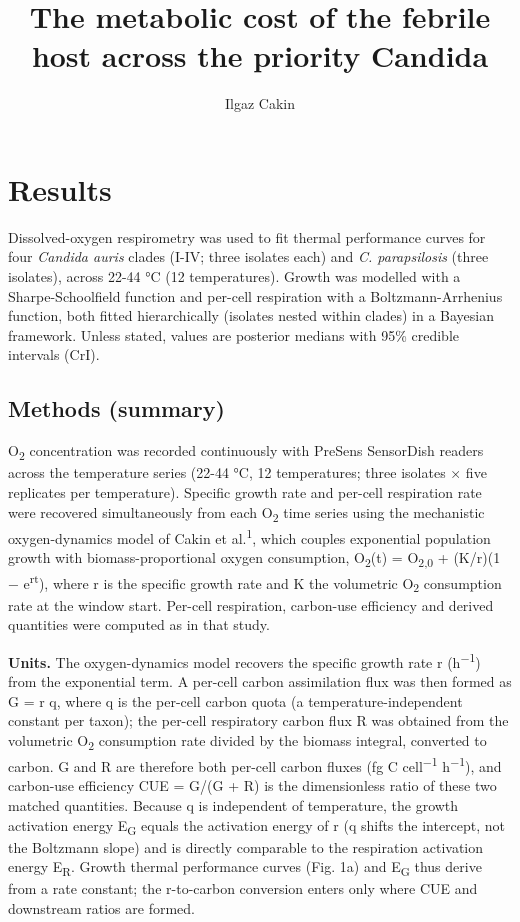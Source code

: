 \documentclass[
]{article}
\title{The metabolic cost of the febrile host across the priority
Candida}
\author{Ilgaz Cakin}
\date{}
\begin{document}
\maketitle


\section{Results}\label{results}

Dissolved-oxygen respirometry was used to fit thermal performance curves
for four \emph{Candida auris} clades (I-IV; three isolates each) and
\emph{C. parapsilosis} (three isolates), across 22-44 °C (12
temperatures). Growth was modelled with a Sharpe-Schoolfield function
and per-cell respiration with a Boltzmann-Arrhenius function, both
fitted hierarchically (isolates nested within clades) in a Bayesian
framework. Unless stated, values are posterior medians with 95\%
credible intervals (CrI).

\subsection{Methods (summary)}\label{methods-summary}

O\textsubscript{2} concentration was recorded continuously with PreSens
SensorDish readers across the temperature series (22-44 °C, 12
temperatures; three isolates × five replicates per temperature).
Specific growth rate and per-cell respiration rate were recovered
simultaneously from each O\textsubscript{2} time series using the
mechanistic oxygen-dynamics model of Cakin et al.\textsuperscript{1},
which couples exponential population growth with biomass-proportional
oxygen consumption, O\textsubscript{2}(t) = O\textsubscript{2,0} +
(K/r)(1 − e\textsuperscript{rt}), where r is the specific growth rate
and K the volumetric O\textsubscript{2} consumption rate at the window
start. Per-cell respiration, carbon-use efficiency and derived
quantities were computed as in that study.

\textbf{Units.} The oxygen-dynamics model recovers the specific growth
rate r (h\textsuperscript{−1}) from the exponential term. A per-cell
carbon assimilation flux was then formed as G = r q, where q is the
per-cell carbon quota (a temperature-independent constant per taxon);
the per-cell respiratory carbon flux R was obtained from the volumetric
O\textsubscript{2} consumption rate divided by the biomass integral,
converted to carbon. G and R are therefore both per-cell carbon fluxes
(fg C cell\textsuperscript{−1} h\textsuperscript{−1}), and carbon-use
efficiency CUE = G/(G + R) is the dimensionless ratio of these two
matched quantities. Because q is independent of temperature, the growth
activation energy E\textsubscript{G} equals the activation energy of r
(q shifts the intercept, not the Boltzmann slope) and is directly
comparable to the respiration activation energy E\textsubscript{R}.
Growth thermal performance curves (Fig. 1a) and E\textsubscript{G} thus
derive from a rate constant; the r-to-carbon conversion enters only
where CUE and downstream ratios are formed.
\end{document}
